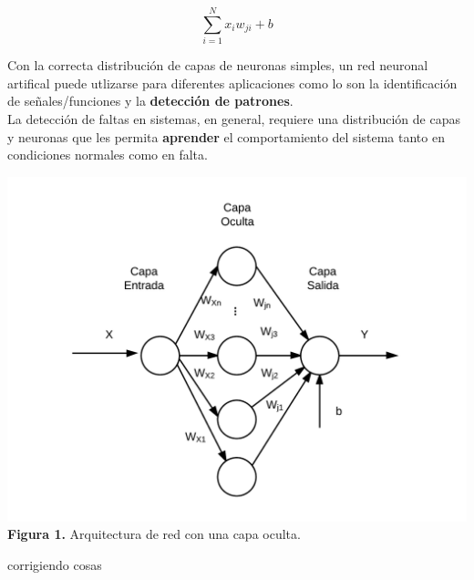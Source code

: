 \documentclass[a0paper,portrait]{baposter}
\begin{document}
\begin{poster}
{\begin{equation}
\sum_{i=1}^{N} x_i w_{ji} + b
\end{equation}


Con la correcta distribución de capas de neuronas simples, un red neuronal artifical puede utlizarse para diferentes aplicaciones como lo son la identificación de señales/funciones y la \textbf{detección de patrones}. \\

La detección de faltas en sistemas, en general, requiere una distribución de capas y neuronas que les permita \textbf{aprender} el comportamiento del sistema tanto en condiciones normales como en falta. 
\begin{center}
\includegraphics[width=\linewidth]{ann}
\\ {\footnotesize \textbf{Figura 1.} Arquitectura de red con una capa oculta.}
\end{center}


corrigiendo cosas

}



\end{poster}
\end{document}
